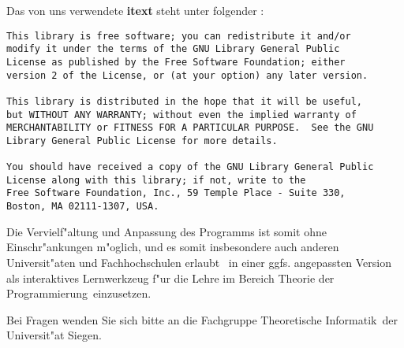 Das von uns verwendete {\bf itext} steht unter folgender :

\begin{verbatim}
This library is free software; you can redistribute it and/or
modify it under the terms of the GNU Library General Public
License as published by the Free Software Foundation; either
version 2 of the License, or (at your option) any later version.

This library is distributed in the hope that it will be useful,
but WITHOUT ANY WARRANTY; without even the implied warranty of
MERCHANTABILITY or FITNESS FOR A PARTICULAR PURPOSE.  See the GNU
Library General Public License for more details.

You should have received a copy of the GNU Library General Public
License along with this library; if not, write to the
Free Software Foundation, Inc., 59 Temple Place - Suite 330,
Boston, MA 02111-1307, USA.
\end{verbatim}

Die Vervielf"altung und Anpassung des Programms ist somit ohne Einschr"ankungen m"oglich, und es somit
     insbesondere auch anderen Universit"aten und Fachhochschulen erlaubt \TPML\ in einer ggfs. angepassten
Version als interaktives Lernwerkzeug f"ur die Lehre im Bereich \glqq Theorie der Programmierung\grqq\ 
einzusetzen.

Bei Fragen wenden Sie sich bitte an die Fachgruppe \glqq Theoretische Informatik\grqq\ der Universit"at Siegen.



